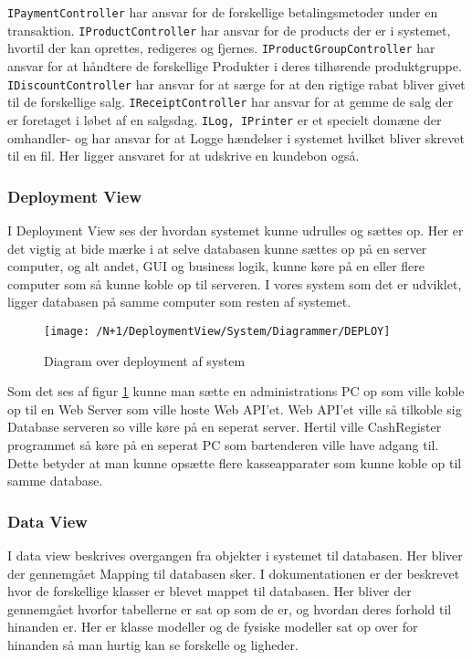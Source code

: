 \texttt{IPaymentController} har ansvar for de forskellige betalingsmetoder under en transaktion. \texttt{IProductController} har ansvar for de products der er i systemet, hvortil der kan oprettes, redigeres og fjernes. 
\texttt{IProductGroupController} har ansvar for at håndtere de forskellige Produkter i deres tilhørende produktgruppe.
\texttt{IDiscountController} har ansvar for at særge for at den rigtige rabat bliver givet til de forskellige salg.
\texttt{IReceiptController} har ansvar for at gemme de salg der er foretaget i løbet af en salgsdag.
\texttt{ILog, IPrinter} er et specielt domæne der omhandler- og har ansvar for at Logge hændelser i systemet hvilket bliver skrevet til en fil. Her ligger ansvaret for at udskrive en kundebon også.


\subsubsection{Deployment View}
I Deployment View ses der hvordan systemet kunne udrulles og sættes op. Her er det vigtig at bide mærke i at selve databasen kunne sættes op på en server computer, og alt andet, GUI og business logik, kunne køre på en eller flere computer som så kunne koble op til  serveren. I vores system som det er udviklet, ligger databasen på samme computer som resten af systemet. \newline\newline
\begin{figure}[H]
	\centering
	\texttt{[image: /N+1/DeploymentView/System/Diagrammer/DEPLOY]}
	\caption{Diagram over deployment af system}
	\label{fig:DeplayDia}
\end{figure}
Som det ses af figur \ref{fig:DeplayDia} kunne man sætte en administrations PC op som ville koble op til en Web Server som ville hoste Web API'et. Web API'et ville så tilkoble sig Database serveren so  ville køre på en seperat server. Hertil ville CashRegister programmet så køre på en seperat PC som bartenderen ville have adgang til. Dette betyder at man kunne opsætte flere kasseapparater som kunne koble op til samme database.  

\subsubsection{Data View}
I data view beskrives overgangen fra objekter i systemet til databasen. Her bliver der gennemgået Mapping til databasen sker.\newline\newline
I dokumentationen er der beskrevet hvor de forskellige klasser er blevet mappet til databasen. Her bliver der gennemgået hvorfor tabellerne er sat op som de er, og hvordan deres forhold til hinanden er. Her er klasse modeller og de fysiske modeller sat op  over for hinanden så man hurtig kan se forskelle og ligheder.

